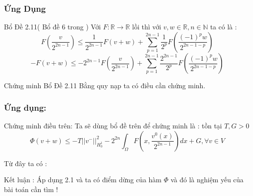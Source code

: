 \documentclass[11pt]{beamer}
\numberwithin{equation}{section}
\theoremstyle{plain}
\theoremstyle{definition}
\theoremstyle{remark}
\begin{document}

\begin{frame}
\frametitle{Ứng Dụng}
\begin{block}{Bổ Đề 2.11( Bổ đề 6 trong \cite{YJMM})}
Với $F:\mathbb{R}\rightarrow \mathbb{R} $ lồi thì với $v,w\in \mathbb{R},n\in \mathbb{N}$ ta có là :
$$F(\frac{v}{2^{2n-1}})\leq \frac{1}{2^{2n-1}}F(v+w)+\sum_{p=1}^{2n-1}\frac{1}{2^p}F(\frac{(-1)^p w}{2^{2n-1-p}})$$
$$-F(v+w)\leq -2^{2n-1}F(\frac{v}{2^{2n-1}})+\sum_{p=1}^{2n-1}\frac{2^{2n-1}}{2^p}F(\frac{(-1)^p w}{2^{2n-1-p}})$$
\end{block}
\begin{block}{Chứng minh Bổ Đề 2.11}
Bằng quy nạp ta có điều cần chứng minh.
\end{block}
\end{frame}

\begin{frame}
\frametitle{Ứng dụng:}
\begin{block}{Chứng minh điều trên:}
Ta sẽ dùng bổ đề trên để chứng minh là : tồn tại $T,G>0$ 
$$\Phi(v+w) \leq -T||v^-||^2_{H^1_0}-2^{2n}\int_{\Omega}F(x,\frac{v^0(x)}{2^{2n-1}})dx+G,\forall v\in V $$
\end{block}
Từ đây ta có :
\begin{block}{Kết luận :}
Áp dụng 2.1 và ta có điểm dừng của hàm $\Phi$ và đó là nghiệm yếu của bài toán cần tìm !
\end{block}
\end{frame}
\end{document}
